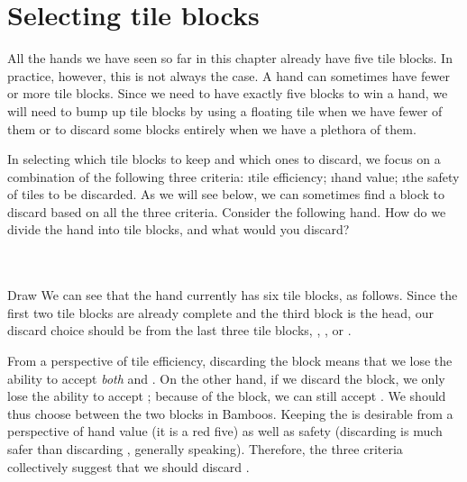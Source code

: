 \newpage

\section{Selecting tile blocks}
All the hands we have seen so far in this chapter already have five tile blocks. In practice, however, this is not always the case. A hand can sometimes have fewer or more tile blocks. Since we need to have exactly five blocks to win a hand, we will need to bump up tile blocks by using a floating tile when we have fewer of them or to discard some blocks entirely when we have a plethora of them. 

\bigskip
In selecting which tile blocks to keep and which ones to discard, we focus on a combination of the following three criteria: 
\be
\i tile efficiency;
\i hand value;
\i the safety of tiles to be discarded.
\ee
As we will see below, we can sometimes find a block to discard based on all the three criteria. 
Consider the following hand. How do we divide the hand into tile blocks, and what would you discard?

\bp 
{}\\ \vspace{-18pt}
\rfs{}~\\
\hspace{290pt}\footnotesize{Draw}
\ep
We can see that the hand currently has six tile blocks, as follows. 
\emj
Since the first two tile blocks are already complete and the third block is the head, our discard choice should be from the last three tile blocks, {\large{}}, {\large{}\rfs}, or {\large{}}. 

\bigskip
From a perspective of tile efficiency, discarding the {\large{}} block means that we lose the ability to accept \emph{both} {\large{}} and {\large{}}. On the other hand, if we discard the {\large{}} block, we only lose the ability to accept {\large{}}; because of the {\large{}\rfs} block, we can still accept {\large{}}. We should thus choose between the two blocks in Bamboos. 
Keeping the {\large\rfs} is desirable from a perspective of hand value (it is a red five) as well as safety (discarding {\large{}} is much safer than discarding {\large{}\rfs}, generally speaking). Therefore, the three criteria collectively suggest that we should discard {\large{}}. 

